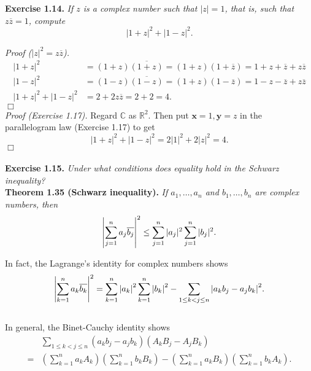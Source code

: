 \documentclass{article}
\begin{document}



\textbf{Exercise 1.14.}
\emph{If $z$ is a complex number such that $|z|=1$, that is, such that $z\overline{z}=1$,
compute
$$|1+z|^2+|1-z|^2.$$}

\emph{Proof ($|z|^2 = z\overline{z}$).}
\begin{align*}
|1+z|^2 &= (1+z)\overline{(1+z)} = (1+z)(1+\overline{z}) = 1+z+\overline{z}+z\overline{z} \\
|1-z|^2 &= (1-z)\overline{(1-z)} = (1+z)(1-\overline{z}) = 1-z-\overline{z}+z\overline{z} \\
|1+z|^2+|1-z|^2 &= 2+2z\overline{z} = 2+2 = 4.
\end{align*}
$\Box$ \\

\emph{Proof (Exercise 1.17).}
Regard $\mathbb{C}$ as $\mathbb{R}^2$.
Then put $\mathbf{x} = 1, \mathbf{y} = z$ in the parallelogram law (Exercise 1.17)
to get $$|1+z|^2+|1-z|^2 = 2|1|^2 + 2|z|^2 = 4.$$
$\Box$ \\\\






\textbf{Exercise 1.15.}
\emph{Under what conditions does equality hold in the Schwarz inequality?} \\

\textbf{Theorem 1.35 (Schwarz inequality).}
\emph{If $a_1, \ldots, a_n$ and $b_1, \ldots, b_n$ are complex numbers, then
$$\abs{\sum_{j=1}^n a_j \overline{b_j}}^2
\leq \sum_{j=1}^n |a_j|^2 \sum_{j=1}^n|b_j|^2.$$}

In fact, the Lagrange's identity for complex numbers shows
$$\abs{ \sum_{k=1}^{n} a_k \overline{b_k} }^2
= \sum_{k=1}^{n} \abs{a_k}^2 \sum_{k=1}^{n} \abs{b_k}^2
- \sum_{1 \leq k < j \leq n}
\abs{ a_k b_j - a_j b_k }^2.$$ \\

In general, the Binet-Cauchy identity shows
\begin{align*}
&\sum_{1 \leq k < j \leq n}
(a_k b_j - a_j b_k)(A_k B_j - A_j B_k) \\
= &\left( \sum_{k=1}^{n} a_k A_k \right)\left( \sum_{k=1}^{n} b_k B_k \right)
- \left( \sum_{k=1}^{n} a_k B_k \right)\left( \sum_{k=1}^{n} b_k A_k \right).
\end{align*} \\
\end{document}
